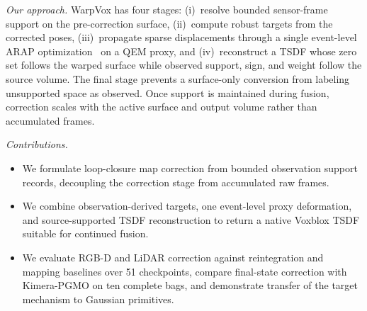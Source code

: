 \vspace{1mm}\noindent\textit{Our approach.}
WarpVox has four stages: (i)~resolve bounded sensor-frame support on the pre-correction surface, (ii)~compute robust targets from the corrected poses, (iii)~propagate sparse displacements through a single event-level ARAP optimization~\cite{ARAP_modeling:2007} on a QEM proxy, and (iv)~reconstruct a TSDF whose zero set follows the warped surface while observed support, sign, and weight follow the source volume. The final stage prevents a surface-only conversion from labeling unsupported space as observed. Once support is maintained during fusion, correction scales with the active surface and output volume rather than accumulated frames.

\vspace{1mm}\noindent\textit{Contributions.}
\begin{itemize}
    \item We formulate loop-closure map correction from bounded observation support records, decoupling the correction stage from accumulated raw frames.
    \item We combine observation-derived targets, one event-level proxy deformation, and source-supported TSDF reconstruction to return a native Voxblox TSDF suitable for continued fusion.
    \item We evaluate RGB-D and LiDAR correction against reintegration and mapping baselines over 51 checkpoints, compare final-state correction with Kimera-PGMO on ten complete bags, and demonstrate transfer of the target mechanism to Gaussian primitives.
\end{itemize}
